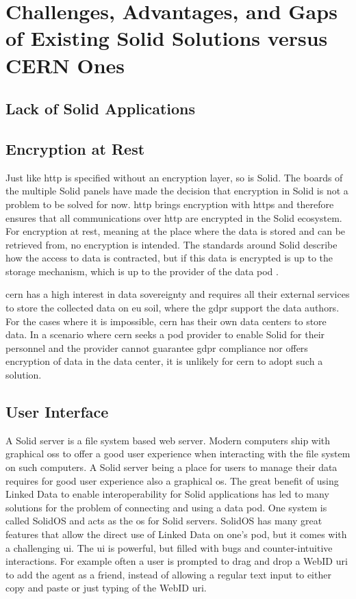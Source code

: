 \section{Challenges, Advantages, and Gaps of Existing Solid Solutions versus CERN Ones}

\subsection{Lack of Solid Applications}

\subsection{Encryption at Rest}

Just like \gls{http} is specified without an encryption layer, so is Solid. The boards of the multiple Solid panels \cite{solid-panels} have made the decision that encryption in Solid is not a problem to be solved for now. \gls{http} brings encryption with \gls{https} and therefore ensures that all communications over \gls{http} are encrypted in the Solid ecosystem. For encryption at rest, meaning at the place where the data is stored and can be retrieved from, no encryption is intended. The standards around Solid describe how the access to data is contracted, but if this data is encrypted is up to the storage mechanism, which is up to the provider of the data pod \cite{solidproject-faqs}.

\gls{cern} has a high interest in data sovereignty and requires all their external services to store the collected data on \gls{eu} soil, where the \gls{gdpr} support the data authors. For the cases where it is impossible, \gls{cern} has their own data centers to store data. In a scenario where \gls{cern} seeks a pod provider to enable Solid for their personnel and the provider cannot guarantee \gls{gdpr} compliance nor offers encryption of data in the data center, it is unlikely for \gls{cern} to adopt such a solution.

\subsection{User Interface}

A Solid server is a file system based web server. Modern computers ship with graphical \glspl{os} to offer a good user experience when interacting with the file system on such computers. A Solid server being a place for users to manage their data requires for good user experience also a graphical \gls{os}. The great benefit of using Linked Data to enable interoperability for Solid applications has led to many solutions for the problem of connecting and using a data pod. One system is called SolidOS \cite{solidos} and acts as the \gls{os} for Solid servers. SolidOS has many great features that allow the direct use of Linked Data on one's pod, but it comes with a challenging \gls{ui}. The \gls{ui} is powerful, but filled with bugs and counter-intuitive interactions. For example often a user is prompted to drag and drop a WebID \gls{uri} to add the agent as a friend, instead of allowing a regular text input to either copy and paste or just typing of the WebID \gls{uri}.

